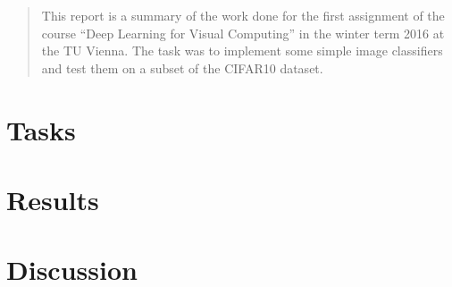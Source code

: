 \newcommand{\ttitle}{Assignment 1: kNN and ???\TODO}
\hyphenation{}
\maketitle



\begin{abstract}
This report is a summary of the work done for the first assignment of the course ``Deep Learning for Visual Computing'' in the winter term 2016 at the TU Vienna. The task was to implement some simple image classifiers and test them on a subset of the CIFAR10 dataset. \TODO
\end{abstract}
\section{Tasks}

\section{Results}
\section{Discussion}